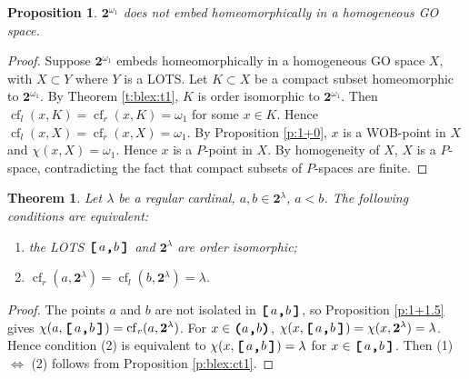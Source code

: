 \documentclass[preprint]{elsarticle}
\def\om{\omega}
\def\la{\lambda}
\newtheorem{proposition}{Proposition}[section]
\newtheorem{theorem}{Theorem}[section]
\theoremstyle{definition}
\theoremstyle{remark}
\def\lrarr{\Leftrightarrow}
\def\cf{\operatorname{cf}}
\def\lex#1#2{\mathfrak{L}(#2^{#1})}
\def\lex#1#2{#2^{#1}}
\def\B{2}
\def\B{\mathsf{2}}
\def\B{\mathbf{2}}
\def\ilcomma/{\boldsymbol{,}}
\def\ilsymlp{\boldsymbol{(}}
\def\ilsymrp{\boldsymbol{)}}
\def\ilsymlc{\boldsymbol{[}}
\def\ilsymrc{\boldsymbol{]}}
\def\ilfont#1{\boldsymbol{#1}}
\def\ilfontX#1{\mathrm{\text{\texttt{\textbf{\large #1}}}}}
\def\ilfontX#1{{\text{\texttt{\textbf{\large \upshape #1}}}}}
\def\ilfont#1{\raisebox{-1.2pt}{\ilfontX{#1}}}
\def\ilfontC#1{\raisebox{-0.7pt}{\ilfontX{#1}}}
\def\ilcomma/{\ilfontC{,}}
\def\ilsymlp{\ilfont{(}}
\def\ilsymrp{\ilfont{)}}
\def\ilsymlc{\ilfont{[}\,}
\def\ilsymrc{\,\ilfont{]}}
\def\ilpp(#1,#2){\ilsymlp#1\ilcomma/ #2\ilsymrp}
\def\ilcc[#1,#2]{\ilsymlc#1\ilcomma/ #2\ilsymrc}
\def\lexab{\lex\la\B}
\begin{document}
\begin{proposition}\label{p:blex:5}
$\lex {\om_1} \B$ does not embed homeomorphically in a homogeneous GO space.
\end{proposition}
\begin{proof}
Suppose $\lex {\om_1} \B$ embeds homeomorphically in a homogeneous GO space $X$, with $X\subset Y$ where $Y$ is a LOTS. Let $K\subset X$ be a compact subset homeomorphic to $\lex {\om_1} \B$.
By Theorem \ref{t:blex:t1}, $K$ is order isomorphic to $\lex {\om_1} \B$. Then $\cf_l(x,K)=\cf_r(x,K)=\om_1$ for some $x\in K$. Hence $\cf_l(x,X)=\cf_r(x,X)=\om_1$. By Proposition \ref{p:1+0}, $x$ is a WOB-point in $X$ and $\chi(x,X)=\om_1$. Hence $x$ is a $P$-point in $X$. By homogeneity of $X$, $X$ is a $P$-space, contradicting the fact that compact subsets of $P$-spaces are finite.
\end{proof}




\begin{theorem}\label{t:blex:2}
Let $\la$ be a regular cardinal, $a,b\in \lexab$, $a<b$.
The following conditions are equivalent:
\begin{enumerate}
\item
the LOTS $\ilcc[a,b]$ and $\lexab$ are order isomorphic;
\item
$\cf_r(a,\lexab)=\cf_l(b,\lexab)=\la$.
\end{enumerate}
\end{theorem}
\begin{proof}
The points $a$ and $b$ are not isolated in $\ilcc[a,b]$, so Proposition \ref{p:1+1.5} gives $\chi(a,\ilcc[a,b])=\cf_r(a,\lexab)$. For $x\in \ilpp(a,b)$, $\chi(x,\ilcc[a,b])=\chi(x,\lexab)=\la$.
Hence condition (2) is equivalent to $\chi(x,\ilcc[a,b])=\la$ for $x\in \ilcc[a,b]$.
Then (1) $\lrarr$ (2) follows from Proposition \ref{p:blex:ct1}.
\end{proof}
\end{document}
